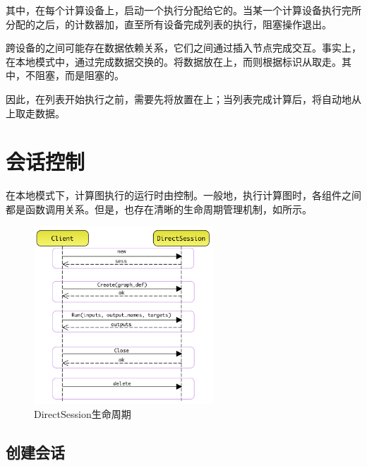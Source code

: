 \begin{content}
其中，在每个计算设备上，启动一个执行分配给它的。当某一个计算设备执行完所分配的之后，的计数器加，直至所有设备完成列表的执行，阻塞操作退出。

跨设备的之间可能存在数据依赖关系，它们之间通过插入节点完成交互。事实上，在本地模式中，通过完成数据交换的。将数据放在上，而则根据标识从取走。其中，不阻塞，而是阻塞的。

因此，在列表开始执行之前，需要先将放置在上；当列表完成计算后，将自动地从上取走数据。

\section{会话控制}

在本地模式下，计算图执行的运行时由控制。一般地，执行计算图时，各组件之间都是函数调用关系。但是，也存在清晰的生命周期管理机制，如所示。

\begin{figure}[H]
\centering
\includegraphics[width=0.6\textwidth]{figures/local-direct-session-lifecycle.png}
\caption{DirectSession生命周期}
 \label{fig:local-direct-session-lifecycle}
\end{figure}

\subsection{创建会话}


\end{content}
